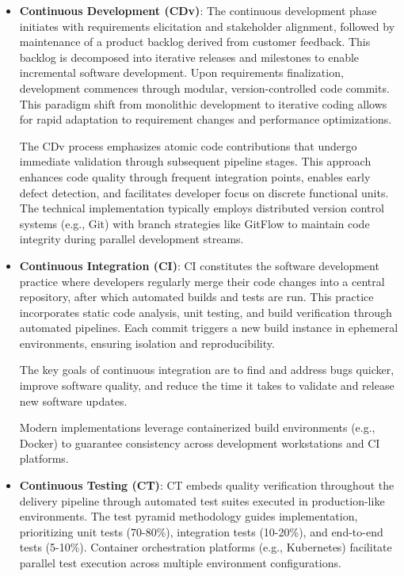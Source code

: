 \documentclass[12pt]{book}
\begin{document}
\begin{itemize}
    \item \textbf{Continuous Development (CDv)}:
    The continuous development phase initiates with requirements elicitation and stakeholder alignment, followed by maintenance of a product backlog derived from customer feedback. This backlog is decomposed into iterative releases and milestones to enable incremental software development. Upon requirements finalization, development commences through modular, version-controlled code commits. This paradigm shift from monolithic development to iterative coding allows for rapid adaptation to requirement changes and performance optimizations.

    The CDv process emphasizes atomic code contributions that undergo immediate validation through subsequent pipeline stages. This approach enhances code quality through frequent integration points, enables early defect detection, and facilitates developer focus on discrete functional units. The technical implementation typically employs distributed version control systems (e.g., Git) with branch strategies like GitFlow to maintain code integrity during parallel development streams.

    \item \textbf{Continuous Integration (CI)}:
    CI constitutes the software development practice where developers regularly merge their code changes into a central repository, after which automated builds and tests are run. This practice incorporates static code analysis, unit testing, and build verification through automated pipelines. Each commit triggers a new build instance in ephemeral environments, ensuring isolation and reproducibility.

    The key goals of continuous integration are to find and address bugs quicker, improve software quality, and reduce the time it takes to validate and release new software updates.

    Modern implementations leverage containerized build environments (e.g., Docker) to guarantee consistency across development workstations and CI platforms.

    \item \textbf{Continuous Testing (CT)}:
    CT embeds quality verification throughout the delivery pipeline through automated test suites executed in production-like environments. The test pyramid methodology guides implementation, prioritizing unit tests (70-80\%), integration tests (10-20\%), and end-to-end tests (5-10\%). Container orchestration platforms (e.g., Kubernetes) facilitate parallel test execution across multiple environment configurations.


\end{itemize}
\end{document}
